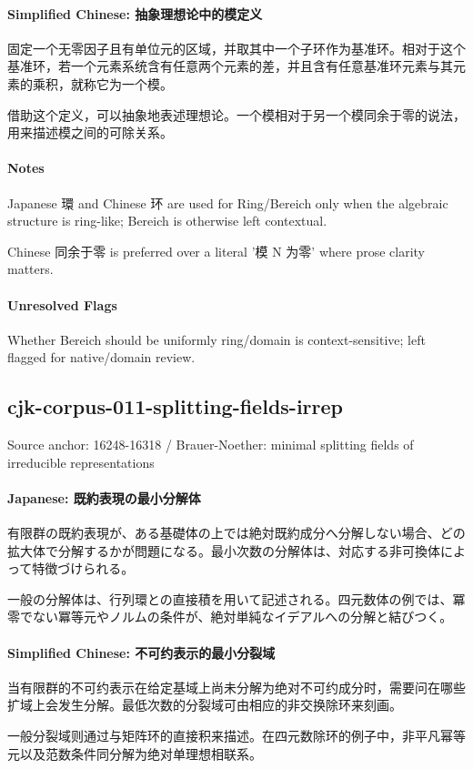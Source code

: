 \documentclass[11pt]{article}
\begin{document}
\paragraph{Simplified Chinese: 抽象理想论中的模定义}
固定一个无零因子且有单位元的区域，并取其中一个子环作为基准环。相对于这个基准环，若一个元素系统含有任意两个元素的差，并且含有任意基准环元素与其元素的乘积，就称它为一个模。\par
借助这个定义，可以抽象地表述理想论。一个模相对于另一个模同余于零的说法，用来描述模之间的可除关系。\par
\paragraph{Notes}
Japanese 環 and Chinese 环 are used for Ring/Bereich only when the algebraic structure is ring-like; Bereich is otherwise left contextual.\par
Chinese 同余于零 is preferred over a literal '模 N 为零' where prose clarity matters.\par
\paragraph{Unresolved Flags}
Whether Bereich should be uniformly ring/domain is context-sensitive; left flagged for native/domain review.\par
\subsection*{cjk-corpus-011-splitting-fields-irrep}
Source anchor: 16248-16318 / Brauer-Noether: minimal splitting fields of irreducible representations
\par
\paragraph{Japanese: 既約表現の最小分解体}
有限群の既約表現が、ある基礎体の上では絶対既約成分へ分解しない場合、どの拡大体で分解するかが問題になる。最小次数の分解体は、対応する非可換体によって特徴づけられる。\par
一般の分解体は、行列環との直接積を用いて記述される。四元数体の例では、冪零でない冪等元やノルムの条件が、絶対単純なイデアルへの分解と結びつく。\par
\paragraph{Simplified Chinese: 不可约表示的最小分裂域}
当有限群的不可约表示在给定基域上尚未分解为绝对不可约成分时，需要问在哪些扩域上会发生分解。最低次数的分裂域可由相应的非交换除环来刻画。\par
一般分裂域则通过与矩阵环的直接积来描述。在四元数除环的例子中，非平凡幂等元以及范数条件同分解为绝对单理想相联系。\par
\end{document}
